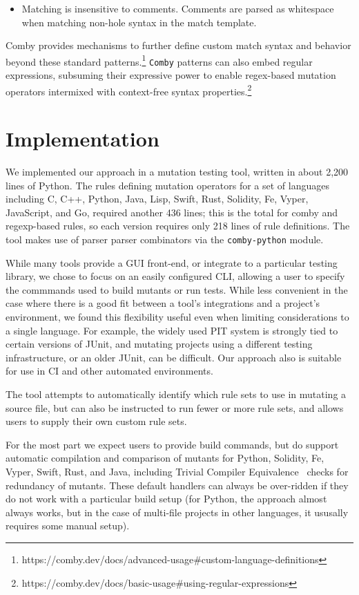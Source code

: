\documentclass[sigconf,review, anonymous]{acmart}
\begin{document}
{\begin{itemize}
\item Matching is insensitive to comments. Comments are parsed as whitespace when matching non-hole syntax in the match template.

\end{itemize}

Comby provides mechanisms to further define custom match syntax and behavior
beyond these standard patterns.\footnote{https://comby.dev/docs/advanced-usage\#custom-language-definitions} \texttt{Comby} patterns can also embed regular expressions, subsuming their
expressive power to enable regex-based mutation operators intermixed with
context-free syntax properties.\footnote{https://comby.dev/docs/basic-usage\#using-regular-expressions}

\section{Implementation}

We implemented our approach in a mutation testing tool, written in
about 2,200 lines of Python.  The rules defining mutation operators
for a set of languages including C, C++, Python, Java, Lisp, Swift,
Rust, Solidity, Fe, Vyper, JavaScript, and Go, required another 436
lines; this is the total for comby and regexp-based rules, so each
version requires only 218 lines of rule definitions.  The tool makes
use of parser parser combinators via the {\tt comby-python} module.

While many tools provide a GUI front-end, or integrate to a particular
testing library, we chose to focus on an easily configured CLI,
allowing a user to specify the commmands used to build mutants or
run tests.  While less convenient in the case where there is a good
fit between a tool's integrations and a project's environment, we
found this flexibility useful even when limiting considerations to a
single language.  For example, the widely used PIT system is strongly tied to
certain versions of JUnit, and mutating projects using a different
testing infrastructure, or an older JUnit, can be difficult.  Our
approach also is suitable for use in CI and other automated
environments.

The tool attempts to automatically identify which rule sets to use in
mutating a source file, but can also be instructed to run fewer or
more rule sets, and allows users to supply their own custom rule sets.

For the most part we expect users to provide build commands, but do
support automatic compilation and comparison of mutants for Python,
Solidity, Fe, Vyper, Swift, Rust, and Java, including Trivial Compiler
Equivalence~\cite{TCE} checks for redundancy of mutants.  These
default handlers can always be over-ridden if they do not work with a
particular build setup (for Python, the approach almost always works,
but in the case of multi-file projects in other languages, it ususally
requires some manual setup).

}
\end{document}
